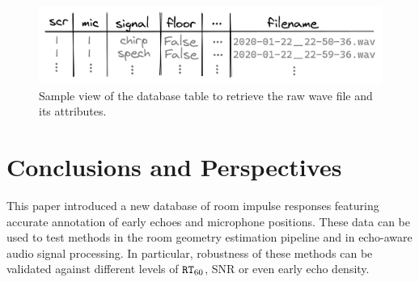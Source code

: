 \begin{figure}
    \centering
    \includegraphics[width=\linewidth]{figures/dechorate/database.png}
    \caption{Sample view of the database table to retrieve the raw wave file and its attributes.}
    \label{fig:dataset}
\end{figure}

\section{Conclusions and Perspectives}

This paper introduced a new database of room impulse responses featuring accurate annotation of early echoes and microphone positions. These data can be used to test methods in the room geometry estimation pipeline and in echo-aware audio signal processing. In particular, robustness of these methods can be validated against different levels of $\mathtt{RT}_{60}$, SNR or even early echo density.